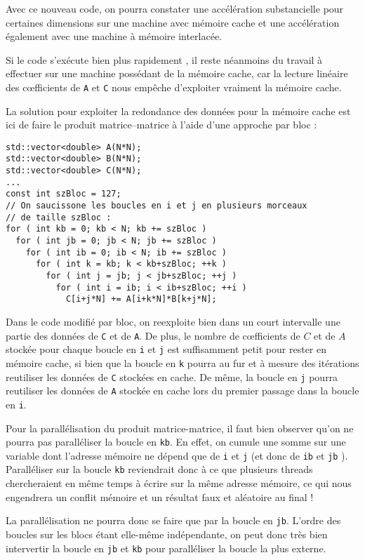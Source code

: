 \documentclass[fleqn,11pt]{article}
\begin{document}
Avec ce nouveau code, on pourra constater une accélération substancielle pour certaines dimensions sur une machine avec mémoire cache et une accélération également avec une machine à mémoire interlacée.

Si le code s'exécute bien plus rapidement , il reste néanmoins du travail à effectuer sur une machine possédant de la mémoire cache, car la lecture linéaire des c{\oe}fficients de \texttt{A} et \texttt{C} nous empêche d'exploiter vraiment la mémoire cache.

La solution pour exploiter la redondance des données pour la mémoire cache est ici de faire le produit matrice--matrice à l'aide d'une approche par bloc :

\begin{lstlisting}
std::vector<double> A(N*N);
std::vector<double> B(N*N);
std::vector<double> C(N*N);
...
const int szBloc = 127;
// On saucissone les boucles en i et j en plusieurs morceaux 
// de taille szBloc :
for ( int kb = 0; kb < N; kb += szBloc )
  for ( int jb = 0; jb < N; jb += szBloc )
    for ( int ib = 0; ib < N; ib += szBloc )
      for ( int k = kb; k < kb+szBloc; ++k )
        for ( int j = jb; j < jb+szBloc; ++j )
          for ( int i = ib; i < ib+szBloc; ++i )
            C[i+j*N] += A[i+k*N]*B[k+j*N];
\end{lstlisting}

Dans le code modifié par bloc, on reexploite bien dans un court intervalle une partie des données
de \texttt{C} et de \texttt{A}. De plus, le nombre de c{\oe}fficients de $C$ et de $A$ stockée pour chaque
boucle en \texttt{i} et \texttt{j} est suffisamment petit pour rester en mémoire cache, si bien que la boucle
en \texttt{k} pourra au fur et à mesure des itérations reutiliser les données de \texttt{C} stockées en cache.
De même, la boucle en \texttt{j} pourra reutiliser les données de \texttt{A} stockée en cache lors du premier passage dans la boucle en \texttt{i}.

Pour la parallélisation du produit matrice-matrice, il faut bien observer qu'on ne pourra pas paralléliser
la boucle en \texttt{kb}. En effet, on cumule une somme sur une variable dont l'adresse mémoire ne dépend
que de \texttt{i} et \texttt{j} (et donc de \texttt{ib} et \texttt{jb} ). Paralléliser sur la boucle 
\texttt{kb} reviendrait donc à ce que plusieurs threads chercheraient en même temps à écrire sur la
même adresse mémoire, ce qui nous engendrera un conflit mémoire et un résultat faux et aléatoire au final !

La parallélisation ne pourra donc se faire que par la boucle en \texttt{jb}. L'ordre des boucles sur les blocs étant elle-même indépendante, on peut donc très bien intervertir la boucle en \texttt{jb} et \texttt{kb} pour paralléliser la boucle la plus externe.
\end{document}
